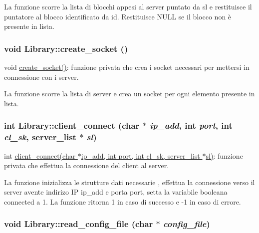 La funzione scorre la lista di blocchi appesi al server puntato da sl e restituisce il puntatore al blocco identificato da id. Restituisce NULL se il blocco non è presente in lista. \hypertarget{classLibrary_cd3582484c72ce7f8758a31e050d64e7_cd3582484c72ce7f8758a31e050d64e7}{
\subsubsection[{create\_\-socket}]{\setlength{\rightskip}{0pt plus 5cm}void Library::create\_\-socket ()}}
\label{classLibrary_cd3582484c72ce7f8758a31e050d64e7_cd3582484c72ce7f8758a31e050d64e7}


void \hyperlink{classLibrary_cd3582484c72ce7f8758a31e050d64e7_cd3582484c72ce7f8758a31e050d64e7}{create\_\-socket()}: funzione privata che crea i socket necessari per mettersi in connessione con i server. 

La funzione scorre la lista di server e crea un socket per ogni elemento presente in lista. \hypertarget{classLibrary_993a8c688576ea49b82283bd5c38c7b5_993a8c688576ea49b82283bd5c38c7b5}{
\subsubsection[{client\_\-connect}]{\setlength{\rightskip}{0pt plus 5cm}int Library::client\_\-connect (char $\ast$ {\em ip\_\-add}, \/  int {\em port}, \/  int {\em cl\_\-sk}, \/  {\bf server\_\-list} $\ast$ {\em sl})}}
\label{classLibrary_993a8c688576ea49b82283bd5c38c7b5_993a8c688576ea49b82283bd5c38c7b5}


int \hyperlink{classLibrary_993a8c688576ea49b82283bd5c38c7b5_993a8c688576ea49b82283bd5c38c7b5}{client\_\-connect(char $\ast$ip\_\-add, int port, int cl\_\-sk, server\_\-list $\ast$sl)}: funzione privata che effettua la connessione del client al server. 

La funzione inizializza le strutture dati necessarie , effettua la connessione verso il server avente indirizo IP ip\_\-add e porta port, setta la variabile booleana connected a 1. La funzione ritorna 1 in caso di successo e -1 in caso di errore. \hypertarget{classLibrary_e64f3f91067ea280395d09420d961901_e64f3f91067ea280395d09420d961901}{
\subsubsection[{read\_\-config\_\-file}]{\setlength{\rightskip}{0pt plus 5cm}void Library::read\_\-config\_\-file (char $\ast$ {\em config\_\-file})}}
\label{classLibrary_e64f3f91067ea280395d09420d961901_e64f3f91067ea280395d09420d961901}


